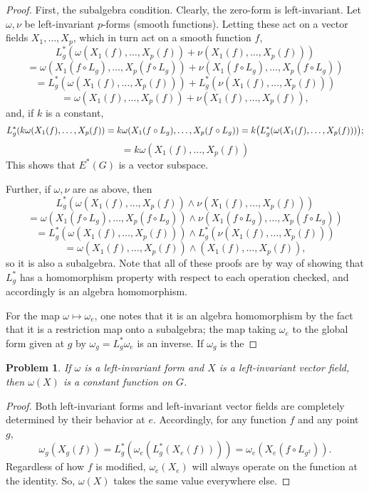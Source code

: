\documentclass{article}
\newtheorem{plm}{Problem}
\begin{document}
\begin{proof}
  First, the subalgebra condition.
  Clearly, the zero-form is left-invariant.
  Let $\omega, \nu$ be left-invariant $p$-forms (smooth functions).
  Letting these act on a vector fields $X_{1}, \ldots, X_{p}$, which in turn act on a smooth function $f$,
  \[
    L_{g}^{*}(\omega(X_{1}(f), \ldots, X_{p}(f)) + \nu(X_{1}(f), \ldots, X_{p}(f)))
  \]
  \[
    = \omega(X_{1}(f \circ L_{g}), \ldots, X_{p}(f \circ L_{g})) + \nu(X_{1}(f \circ L_{g}), \ldots, X_{p}(f \circ L_{g}))
  \]
  \[
    = L_{g}^{*}(\omega(X_{1}(f), \ldots, X_{p}(f))) + L_{g}^{*}(\nu(X_{1}(f), \ldots, X_{p}(f)))
  \]
  \[
    = \omega(X_{1}(f), \ldots, X_{p}(f)) + \nu(X_{1}(f), \ldots, X_{p}(f)),
  \]
  and, if $k$ is a constant,
  \[
    L_{g}^{*}(k\omega(X_{1}(f), \ldots, X_{p}(f))
    = k\omega(X_{1}(f \circ L_{g}), \ldots, X_{p}(f \circ L_{g}))
    = k\qty(L_{g}^{*}(\omega(X_{1}(f), \ldots, X_{p}(f))));
  \]
  \[
    = k\omega(X_{1}(f), \ldots, X_{p}(f))
  \]
  This shows that $E^{*}(G)$ is a vector subspace.

  Further, if $\omega, \nu$ are as above,
  then
  \[
    L_{g}^{*}(\omega(X_{1}(f), \ldots, X_{p}(f)) \wedge \nu(X_{1}(f), \ldots, X_{p}(f)))
  \]
  \[
    = \omega(X_{1}(f \circ L_{g}), \ldots, X_{p}(f \circ L_{g})) \wedge \nu(X_{1}(f \circ L_{g}), \ldots, X_{p}(f \circ L_{g}))
  \]
  \[
    = L_{g}^{*}(\omega(X_{1}(f), \ldots, X_{p}(f))) \wedge L_{g}^{*}(\nu(X_{1}(f), \ldots, X_{p}(f)))
  \]
  \[
    = \omega(X_{1}(f), \ldots, X_{p}(f)) \wedge (X_{1}(f), \ldots, X_{p}(f)),
  \]
  so it is also a subalgebra.
  Note that all of these proofs are by way of showing that $L_{g}^{*}$ has a homomorphism property with respect to each operation checked,
  and accordingly is an algebra homomorphism.

  For the map $\omega \mapsto \omega_{e}$, one notes that it is an algebra homomorphism by the fact that it is a restriction map
  onto a subalgebra; %
  the map taking $\omega_{e}$ to the global form given at $g$ by $\omega_{g} = L_{g}^{*}\omega_{e}$ is an inverse.
  If $\omega_{g}$ is the

\end{proof}

\begin{plm}
  If $\omega$ is a left-invariant form and $X$ is a left-invariant vector field, then $\omega(X)$ is a constant function on $G$.
\end{plm}

\begin{proof}
  Both left-invariant forms and left-invariant vector fields are completely determined by their behavior at $e$.
  Accordingly, for any function $f$ and any point $g$,
  \[
    \omega_{g}(X_{g}(f)) = L_{g}^{*}(\omega_{e}(L_{g}^{*}(X_{e}(f))))
    = \omega_{e}(X_{e}(f \circ L_{g^{2}})).
  \]
  Regardless of how $f$ is modified, $\omega_{e}(X_{e})$ will always operate on the function at the identity.
  So, $\omega(X)$ takes the same value everywhere else.
\end{proof}
\end{document}
